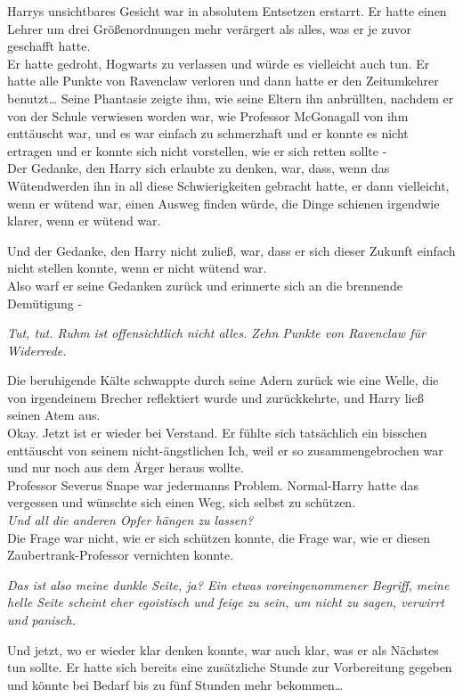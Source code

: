 {Harrys unsichtbares Gesicht war in absolutem Entsetzen erstarrt. Er hatte einen Lehrer um drei Größenordnungen mehr verärgert als alles, was er je zuvor geschafft hatte.\\ Er hatte gedroht, Hogwarts zu verlassen und würde es vielleicht auch tun. Er hatte alle Punkte von Ravenclaw verloren und dann hatte er den Zeitumkehrer benutzt… Seine Phantasie zeigte ihm, wie seine Eltern ihn anbrüllten, nachdem er von der Schule verwiesen worden war, wie Professor McGonagall von ihm enttäuscht war, und es war einfach zu schmerzhaft und er konnte es nicht ertragen und er konnte sich nicht vorstellen, wie er sich retten sollte -\\ Der Gedanke, den Harry sich erlaubte zu denken, war, dass, wenn das Wütendwerden ihn in all diese Schwierigkeiten gebracht hatte, er dann vielleicht, wenn er wütend war, einen Ausweg finden würde, die Dinge schienen irgendwie klarer, wenn er wütend war.

Und der Gedanke, den Harry nicht zuließ, war, dass er sich dieser Zukunft einfach nicht stellen konnte, wenn er nicht wütend war.\\ Also warf er seine Gedanken zurück und erinnerte sich an die brennende Demütigung -

\emph{Tut, tut. Ruhm ist offensichtlich nicht alles. Zehn Punkte von Ravenclaw für Widerrede.}

Die beruhigende Kälte schwappte durch seine Adern zurück wie eine Welle, die von irgendeinem Brecher reflektiert wurde und zurückkehrte, und Harry ließ seinen Atem aus.\\ Okay. Jetzt ist er wieder bei Verstand. Er fühlte sich tatsächlich ein bisschen enttäuscht von seinem nicht-ängstlichen Ich, weil er so zusammengebrochen war und nur noch aus dem Ärger heraus wollte.\\ Professor Severus Snape war jedermanns Problem. Normal-Harry hatte das vergessen und wünschte sich einen Weg, sich selbst zu schützen.\\ \emph{Und all die anderen Opfer hängen zu lassen?}\\ Die Frage war nicht, wie er sich schützen konnte, die Frage war, wie er diesen Zaubertrank-Professor vernichten konnte.

\emph{Das ist also meine dunkle Seite, ja? Ein etwas voreingenommener Begriff, meine helle Seite scheint eher egoistisch und feige zu sein, um nicht zu sagen, verwirrt und panisch.}

Und jetzt, wo er wieder klar denken konnte, war auch klar, was er als Nächstes tun sollte. Er hatte sich bereits eine zusätzliche Stunde zur Vorbereitung gegeben und könnte bei Bedarf bis zu fünf Stunden mehr bekommen…

}
